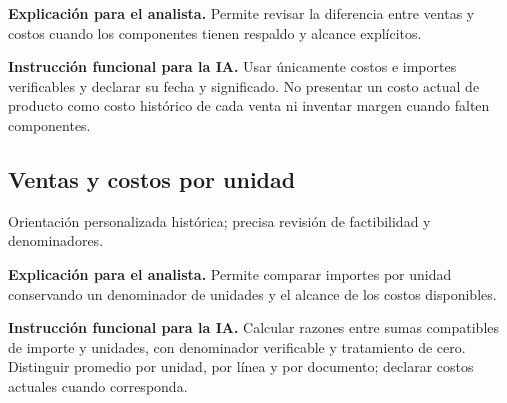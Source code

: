 \textbf{Explicación para el analista.} Permite revisar la diferencia entre ventas y costos cuando los componentes tienen respaldo y alcance explícitos.

\textbf{Instrucción funcional para la IA.} Usar únicamente costos e importes verificables y declarar su fecha y significado. No presentar un costo actual de producto como costo histórico de cada venta ni inventar margen cuando falten componentes.

\subsection{Ventas y costos por unidad}
Orientación personalizada histórica; precisa revisión de factibilidad y denominadores.

\textbf{Explicación para el analista.} Permite comparar importes por unidad conservando un denominador de unidades y el alcance de los costos disponibles.

\textbf{Instrucción funcional para la IA.} Calcular razones entre sumas compatibles de importe y unidades, con denominador verificable y tratamiento de cero. Distinguir promedio por unidad, por línea y por documento; declarar costos actuales cuando corresponda.
